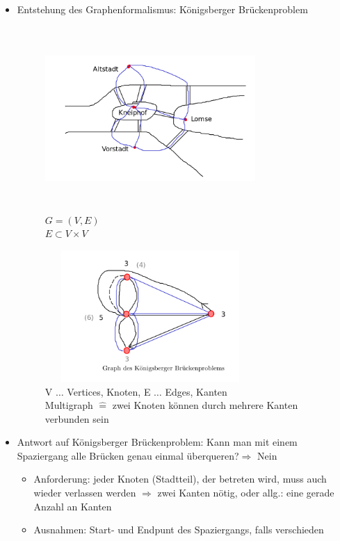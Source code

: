 \documentclass[11pt, fleqn]{scrreprt}
\begin{document}
\begin{itemize}
    \item Entstehung des Graphenformalismus: Königsberger Brückenproblem

    \begin{figure}[htbp]
        \begin{minipage}[t]{8cm}
            \centering
            \vspace{0cm}
            \includegraphics[width=8cm,height=7cm,keepaspectratio]{./Pictures/Koenigsberg.png}\\
            $G = (V, E)$\\
            $E \subset V \times V$
        \end{minipage}
        \begin{minipage}[t]{8cm}
            \vspace{0cm}
            \includegraphics[width=8cm,height=5cm,keepaspectratio]{./Pictures/Brueckengraph.png}\\
            V $\dots$ Vertices, Knoten, E $\dots$ Edges, Kanten\\
            Multigraph $\widehat{=}$ zwei Knoten können durch mehrere Kanten verbunden sein
        \end{minipage}
    \end{figure}

    \item Antwort auf Königsberger Brückenproblem: \glqq Kann man mit einem Spaziergang alle Brücken genau einmal überqueren?\grqq $\Rightarrow$ Nein
    \begin{itemize}
        \item Anforderung: jeder Knoten (Stadtteil), der betreten wird, muss auch wieder verlassen werden $\Rightarrow$ zwei Kanten nötig, oder allg.: eine gerade Anzahl an Kanten
        \item Ausnahmen: Start- und Endpunt des Spaziergangs, falls verschieden
    \end{itemize}
\end{itemize}
\end{document}
